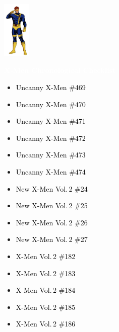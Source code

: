 \documentclass[12pt]{article}
\newcommand{\checkbox}{\raisebox{0.0ex}{\fbox{\rule{0ex}{1.5ex} \rule{1.5ex}{0ex}}}}
\begin{document}
\begin{center}
    \vspace*{2cm}
    \includegraphics[width=0.1\textwidth]{cyclops.png}
    \vspace{0.3cm}

    {\Huge \textbf{\textcolor{white}{X-Men Chronological Checklist}}}
\end{center}

\vspace{0.3cm}
\noindent
\begin{tcolorbox}[
  colback=white!95!gray,
  colframe=black,
  width=\textwidth,
  arc=4mm,
  auto outer arc,
  boxrule=0.8pt,
  left=8pt,right=8pt,top=8pt,bottom=8pt
]
\begin{itemize}[left=0pt,label={\checkbox}]
  \item \textcolor{black}{Uncanny X-Men \#469}
  \item \textcolor{black}{Uncanny X-Men \#470}
  \item \textcolor{black}{Uncanny X-Men \#471}
  \item \textcolor{black}{Uncanny X-Men \#472}
  \item \textcolor{black}{Uncanny X-Men \#473}
  \item \textcolor{black}{Uncanny X-Men \#474}
  \item \textcolor{black}{New X-Men Vol.\,2 \#24}
  \item \textcolor{black}{New X-Men Vol.\,2 \#25}
  \item \textcolor{black}{New X-Men Vol.\,2 \#26}
  \item \textcolor{black}{New X-Men Vol.\,2 \#27}
  \item \textcolor{black}{X-Men Vol.\,2 \#182}
  \item \textcolor{black}{X-Men Vol.\,2 \#183}
  \item \textcolor{black}{X-Men Vol.\,2 \#184}
  \item \textcolor{black}{X-Men Vol.\,2 \#185}
  \item \textcolor{black}{X-Men Vol.\,2 \#186}
\end{itemize}
\end{tcolorbox}
\end{document}
